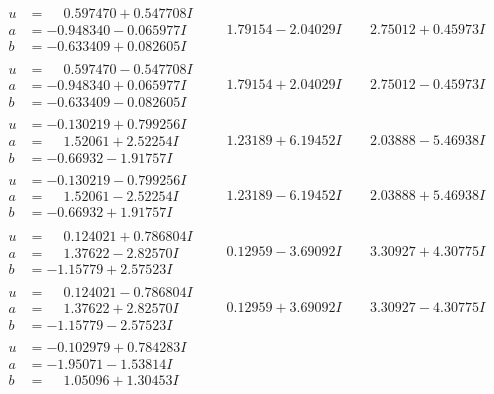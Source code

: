 \documentclass[1p]{elsarticle_modified}
\theoremstyle{definition}
\begin{document}
$$\begin{array}{c|c|c}
\begin{aligned}
u &= \phantom{-}0.597470 + 0.547708 I \\
a &= -0.948340 - 0.065977 I \\
b &= -0.633409 + 0.082605 I\end{aligned}
 & \phantom{-}1.79154 - 2.04029 I & \phantom{-}2.75012 + 0.45973 I \\ \hline\begin{aligned}
u &= \phantom{-}0.597470 - 0.547708 I \\
a &= -0.948340 + 0.065977 I \\
b &= -0.633409 - 0.082605 I\end{aligned}
 & \phantom{-}1.79154 + 2.04029 I & \phantom{-}2.75012 - 0.45973 I \\ \hline\begin{aligned}
u &= -0.130219 + 0.799256 I \\
a &= \phantom{-}1.52061 + 2.52254 I \\
b &= -0.66932 - 1.91757 I\end{aligned}
 & \phantom{-}1.23189 + 6.19452 I & \phantom{-}2.03888 - 5.46938 I \\ \hline\begin{aligned}
u &= -0.130219 - 0.799256 I \\
a &= \phantom{-}1.52061 - 2.52254 I \\
b &= -0.66932 + 1.91757 I\end{aligned}
 & \phantom{-}1.23189 - 6.19452 I & \phantom{-}2.03888 + 5.46938 I \\ \hline\begin{aligned}
u &= \phantom{-}0.124021 + 0.786804 I \\
a &= \phantom{-}1.37622 - 2.82570 I \\
b &= -1.15779 + 2.57523 I\end{aligned}
 & \phantom{-}0.12959 - 3.69092 I & \phantom{-}3.30927 + 4.30775 I \\ \hline\begin{aligned}
u &= \phantom{-}0.124021 - 0.786804 I \\
a &= \phantom{-}1.37622 + 2.82570 I \\
b &= -1.15779 - 2.57523 I\end{aligned}
 & \phantom{-}0.12959 + 3.69092 I & \phantom{-}3.30927 - 4.30775 I \\ \hline\begin{aligned}
u &= -0.102979 + 0.784283 I \\
a &= -1.95071 - 1.53814 I \\
b &= \phantom{-}1.05096 + 1.30453 I\end{aligned}

\end{array}$$
\end{document}
